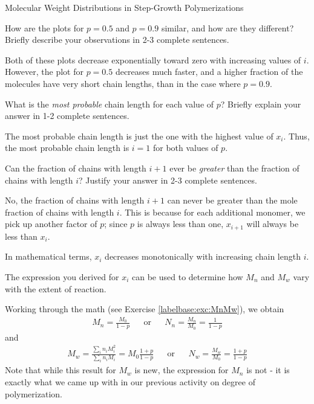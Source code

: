 \begin{activity}{Molecular Weight Distributions in Step-Growth Polymerizations}
\begin{ctqs}
	\clearpage
	\question How are the plots for $p=0.5$ and $p=0.9$ similar, and how are they different?  Briefly describe your observations in 2-3 complete sentences.
	
		\begin{solution}[2in]
		
			Both of these plots decrease exponentially toward zero with increasing values of $i$.  However, the plot for $p=0.5$ decreases much faster, and a higher fraction of the molecules have very short chain lengths, than in the case where $p=0.9$.
		\end{solution}
	
	\question What is the \emph{most probable} chain length for each value of $p$?  Briefly explain your answer in 1-2 complete sentences.
	
		\begin{solution}[2in]
		
			The most probable chain length is just the one with the highest value of $x_i$.  Thus, the most probable chain length is $i=1$ for both values of $p$.
		
		\end{solution}
	
	\question Can the fraction of chains with length $i+1$ ever be \emph{greater} than the fraction of chains with length $i$?  Justify your answer in 2-3 complete sentences.
	
		\begin{solution}[1.5in]
		
			No, the fraction of chains with length $i+1$ can never be greater than the mole fraction of chains with length $i$.  This is because for each additional monomer, we pick up another factor of $p$; since $p$ is always less than one, $x_{i+1}$ will always be less than $x_i$.
			
			In mathematical terms, $x_i$ decreases monotonically with increasing chain length $i$.
		
		\end{solution}
	
\end{ctqs}

\clearpage
\begin{model}
\label{\labelbase:mdl:MwMn}

	The expression you derived for $x_i$ can be used to determine how $M_n$ and $M_w$ vary with the extent of reaction.
	
	Working through the math (see Exercise \ref{labelbase:exc:MnMw}), we obtain
	\begin{align*}
		M_n = \frac{M_0}{1-p} && \text{or} && N_n = \frac{M_n}{M_0} = \frac{1}{1-p}
	\end{align*}
	and
	\begin{align*}
		M_w = \frac{\sum_i n_i M_i^2}{\sum_i n_i M_i} = M_0\frac{1+p}{1-p} && \text{or} && N_w = \frac{M_w}{M_0} = \frac{1+p}{1-p}
	\end{align*}
	Note that while this result for $M_w$ is new, the expression for $M_n$ is not - it is exactly what we came up with in our previous activity on degree of polymerization.


\end{model}
\end{activity}
